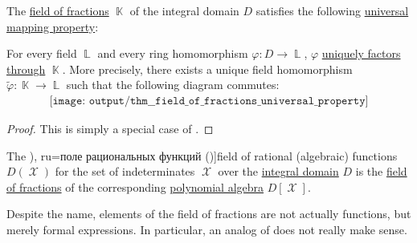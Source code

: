\begin{theorem}\label{thm:field_of_fractions_universal_property}
  The \hyperref[thm:field_of_fractions]{field of fractions} \( \BbbK \) of the integral domain \( D \) satisfies the following \hyperref[rem:universal_mapping_property]{universal mapping property}:
  \begin{displayquote}
    For every field \( \BbbL \) and every ring homomorphism \( \varphi: D \to \BbbL \), \( \varphi \) \hyperref[def:factors_through]{uniquely factors through} \( \BbbK \). More precisely, there exists a unique field homomorphism \( \widetilde{\varphi}: \BbbK \to \BbbL \) such that the following diagram commutes:
    \begin{equation}\label{eq:thm:field_of_fractions_universal_property/diagram}
      \begin{aligned}
        \texttt{[image: output/thm\_\_field\_of\_fractions\_universal\_property]}
      \end{aligned}
    \end{equation}
  \end{displayquote}
\end{theorem}
\begin{proof}
  This is simply a special case of .
\end{proof}

\begin{definition}\label{def:rational_function_field}
  The \term[bg=поле на рационалните функции (\cite[360]{ГеновМиховскиМоллов1991}), ru=поле рациональных функций (\cite[18]{Шафаревич1999})]{field of rational (algebraic) functions} \( D(\mscrX) \) for the set of indeterminates \( \mscrX \) over the \hyperref[def:integral_domain]{integral domain} \( D \) is the \hyperref[thm:field_of_fractions]{field of fractions} of the corresponding \hyperref[def:polynomial_algebra]{polynomial algebra} \( D[\mscrX] \).
\end{definition}
\begin{comments}
  \item Despite the name, elements of the field of fractions are not actually functions, but merely formal expressions. In particular, an analog of  does not really make sense.
\end{comments}

